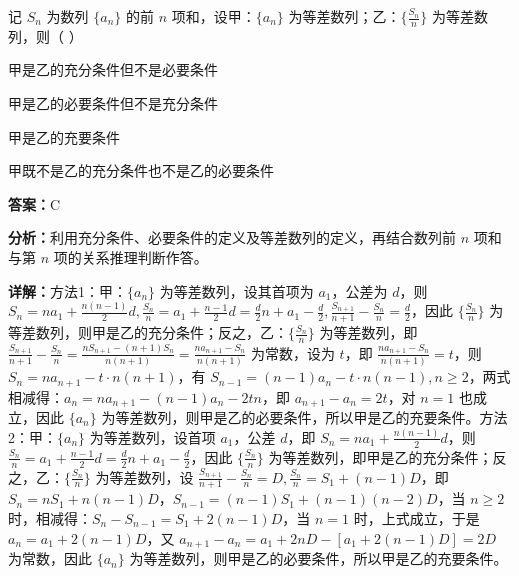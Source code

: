 \begin{question}[points=5]
记 $S_n$ 为数列 $\{a_n\}$ 的前 $n$ 项和，设甲：$\{a_n\}$ 为等差数列；乙：$\{\frac{S_n}{n}\}$ 为等差数列，则（ ）
\begin{choices}
  \item 甲是乙的充分条件但不是必要条件
  \item 甲是乙的必要条件但不是充分条件
  \item 甲是乙的充要条件
  \item 甲既不是乙的充分条件也不是乙的必要条件
\end{choices}
\begin{solution}
\textbf{答案：}C

\textbf{分析：}利用充分条件、必要条件的定义及等差数列的定义，再结合数列前 $n$ 项和与第 $n$ 项的关系推理判断作答。

\textbf{详解：}方法1：甲：$\{a_n\}$ 为等差数列，设其首项为 $a_1$，公差为 $d$，则 $S_n=na_1+\frac{n(n-1)}{2}d, \frac{S_n}{n}=a_1+\frac{n-1}{2}d=\frac{d}{2}n+a_1-\frac{d}{2}, \frac{S_{n+1}}{n+1}-\frac{S_n}{n}=\frac{d}{2}$，因此 $\{\frac{S_n}{n}\}$ 为等差数列，则甲是乙的充分条件；反之，乙：$\{\frac{S_n}{n}\}$ 为等差数列，即 $\frac{S_{n+1}}{n+1}-\frac{S_n}{n}=\frac{nS_{n+1}-(n+1)S_n}{n(n+1)}=\frac{na_{n+1}-S_n}{n(n+1)}$ 为常数，设为 $t$，即 $\frac{na_{n+1}-S_n}{n(n+1)}=t$，则 $S_n=na_{n+1}-t\cdot n(n+1)$，有 $S_{n-1}=(n-1)a_n-t\cdot n(n-1), n\geq 2$，两式相减得：$a_n=na_{n+1}-(n-1)a_n-2tn$，即 $a_{n+1}-a_n=2t$，对 $n=1$ 也成立，因此 $\{a_n\}$ 为等差数列，则甲是乙的必要条件，所以甲是乙的充要条件。方法2：甲：$\{a_n\}$ 为等差数列，设首项 $a_1$，公差 $d$，即 $S_n=na_1+\frac{n(n-1)}{2}d$，则 $\frac{S_n}{n}=a_1+\frac{n-1}{2}d=\frac{d}{2}n+a_1-\frac{d}{2}$，因此 $\{\frac{S_n}{n}\}$ 为等差数列，即甲是乙的充分条件；反之，乙：$\{\frac{S_n}{n}\}$ 为等差数列，设 $\frac{S_{n+1}}{n+1}-\frac{S_n}{n}=D, \frac{S_n}{n}=S_1+(n-1)D$，即 $S_n=nS_1+n(n-1)D$，$S_{n-1}=(n-1)S_1+(n-1)(n-2)D$，当 $n\geq 2$ 时，相减得：$S_n-S_{n-1}=S_1+2(n-1)D$，当 $n=1$ 时，上式成立，于是 $a_n=a_1+2(n-1)D$，又 $a_{n+1}-a_n=a_1+2nD-[a_1+2(n-1)D]=2D$ 为常数，因此 $\{a_n\}$ 为等差数列，则甲是乙的必要条件，所以甲是乙的充要条件。
\end{solution}
\end{question}

